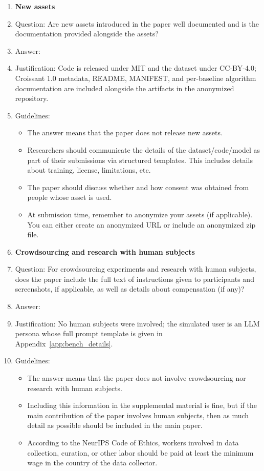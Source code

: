 \documentclass[11pt]{article}
\begin{document}
\begin{enumerate}
\item {\bf New assets}
    \item[] Question: Are new assets introduced in the paper well documented and is the documentation provided alongside the assets?
    \item[] Answer: \answerYes{}
    \item[] Justification: Code is released under MIT and the dataset under CC-BY-4.0; Croissant 1.0 metadata, README, MANIFEST, and per-baseline algorithm documentation are included alongside the artifacts in the anonymized repository.
    \item[] Guidelines:
    \begin{itemize}
        \item The answer \answerNA{} means that the paper does not release new assets.
        \item Researchers should communicate the details of the dataset\slash code\slash model as part of their submissions via structured templates. This includes details about training, license, limitations, etc.
        \item The paper should discuss whether and how consent was obtained from people whose asset is used.
        \item At submission time, remember to anonymize your assets (if applicable). You can either create an anonymized URL or include an anonymized zip file.
    \end{itemize}

\item {\bf Crowdsourcing and research with human subjects}
    \item[] Question: For crowdsourcing experiments and research with human subjects, does the paper include the full text of instructions given to participants and screenshots, if applicable, as well as details about compensation (if any)?
    \item[] Answer: \answerNA{}
    \item[] Justification: No human subjects were involved; the simulated user is an LLM persona whose full prompt template is given in Appendix~\ref{app:bench_details}.
    \item[] Guidelines:
    \begin{itemize}
        \item The answer \answerNA{} means that the paper does not involve crowdsourcing nor research with human subjects.
        \item Including this information in the supplemental material is fine, but if the main contribution of the paper involves human subjects, then as much detail as possible should be included in the main paper.
        \item According to the NeurIPS Code of Ethics, workers involved in data collection, curation, or other labor should be paid at least the minimum wage in the country of the data collector.
    \end{itemize}


\end{enumerate}
\end{document}
